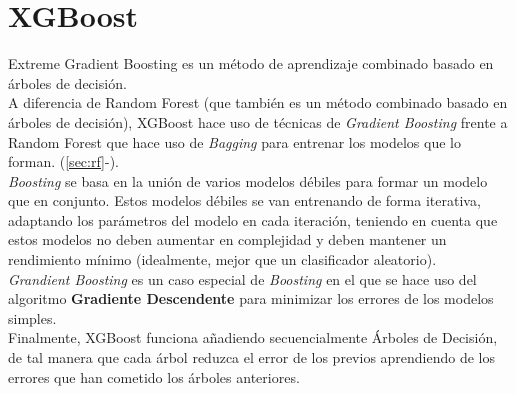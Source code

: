 \section{XGBoost}
\label{alg:xgb}
Extreme Gradient Boosting es un método de aprendizaje combinado basado en árboles de decisión.\\
A diferencia de Random Forest (que también es un método combinado basado en árboles de decisión), XGBoost hace uso de técnicas de \textit{Gradient Boosting} frente a Random Forest que hace uso de \textit{Bagging} para entrenar los modelos que lo forman. (\ref{sec:rf}-).\\
\linebreak
\textit{Boosting} se basa en la unión de varios modelos débiles para formar un modelo que en conjunto. Estos modelos débiles se van entrenando de forma iterativa, adaptando los parámetros del modelo en cada iteración, teniendo en cuenta que estos modelos no deben aumentar en complejidad y deben mantener un rendimiento mínimo (idealmente, mejor que un clasificador aleatorio).\\
\linebreak
\textit{Grandient Boosting} es un caso especial de \textit{Boosting} en el que se hace uso del algoritmo \textbf{Gradiente Descendente} para minimizar los errores de los modelos simples.\\
\linebreak
Finalmente, XGBoost funciona añadiendo secuencialmente Árboles de Decisión, de tal manera que cada árbol reduzca el error de los previos aprendiendo de los errores que han cometido los árboles anteriores.
